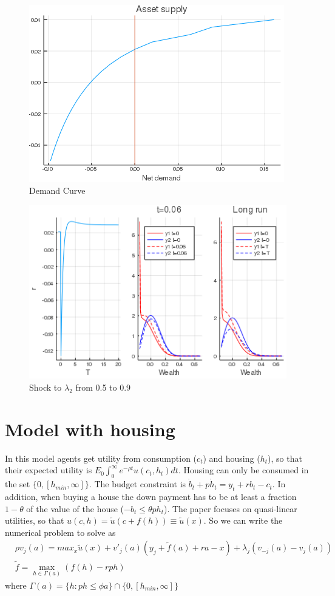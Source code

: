 \documentclass[12pt]{article}
\begin{document}
\begin{figure}
\center
\includegraphics{HuggettSupply.png} \caption{Demand Curve}\label{figDemand}
\end{figure}

\begin{figure}
\center
\includegraphics{HuggettShock.png} \caption{Shock to $\lambda_2$ from 0.5 to 0.9}\label{figShock}
\end{figure}


\section{Model with housing}
In this model agents get utility from consumption ($c_t$) and housing ($h_t$), so that their expected utility is $E_0 \int_0^\infty e^{-\rho t}u(c_t,h_t)dt$. Housing can only be consumed in the set $\{0,[h_{min},\infty]\}$. The budget constraint is $\dot{b}_t+p \dot{h}_t=y_t+rb_t-c_t$. In addition, when buying a house the down payment has to be at least a fraction $1-\theta$ of the value of the house ($-b_t\leq \theta p h_t$). The paper focuses on quasi-linear utilities, so that $u(c,h)=\tilde{u}(c+f(h))\equiv \tilde{u}(x)$. So we can write the numerical problem to solve as
\begin{equation}
\begin{split}
&\rho v_j(a) = max_x \tilde{u}(x)+v'_j(a)(y_j+\tilde{f}(a)+ra-x)+\lambda_j(v_{-j}(a)-v_j(a))\\
&\tilde{f}=\max_{h\in \Gamma(a)}(f(h)-rph)
\end{split}
\end{equation}
where $\Gamma(a)=\{h:ph\leq\phi a\}\cap\{0,[h_{min},\infty]\}$
\end{document}
